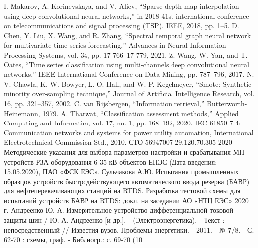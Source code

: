 I. Makarov, A. Korinevskaya, and V. Aliev, “Sparse depth map interpolation using deep
convolutional neural networks,” in 2018 41st international conference on
telecommunications and signal processing (TSP). IEEE, 2018, pp. 1–5.
D. Chen, Y. Liu, X. Wang, and R. Zhang, “Spectral temporal graph neural network for
multivariate time-series forecasting,” Advances in Neural Information Processing Systems,
vol. 34, pp. 17 766–17 779, 2021.
Z. Wang, W. Yan, and T. Oates, “Time series classification using multi-channels deep
convolutional neural networks,” IEEE International Conference on Data Mining, pp. 787–796,
2017.
N. V. Chawla, K. W. Bowyer, L. O. Hall, and W. P. Kegelmeyer, “Smote: Synthetic minority
over-sampling technique,” Journal of Artificial Intelligence Research, vol. 16, pp.
321–357, 2002.
C. van Rijsbergen, “Information retrieval,” Butterworth-Heinemann, 1979.
A. Tharwat, “Classification assessment methods,” Applied Computing and Informatics, vol.
17, no. 1, pp. 168–192, 2020.
IEC 61850-7-4: Communication networks and systems for power utility automation,
International Electrotechnical Commission Std., 2010.
СТО 56947007-29.120.70.305-2020 Методические указания для выбора параметров настройки и
срабатывания МП устройств РЗА оборудования 6-35 кВ объектов ЕНЭС (Дата введения:
15.05.2020), ПАО «ФСК ЕЭС».
Сульчакова А.Ю. Испытания промышленных образцов устройств быстродействующего
автоматического ввода резерва (БАВР) для нефтеперекачивающих станций на RTDS. Разработка
тестовой схемы для испытаний устройств БАВР на RTDS: докл. на заседании АО «НТЦ ЕЭС» 2020
г.
Андреенко Ю. А. Измерительное устройство дифференциальной токовой защиты шин / Ю. А.
Андреенко [и др.]. - (Электроэнергетика). - Текст : непосредственный // Известия вузов.
Проблемы энергетики. - 2011. - № 7/8. - С. 62-70 : схемы, граф. - Библиогр.: с. 69-70 (10
